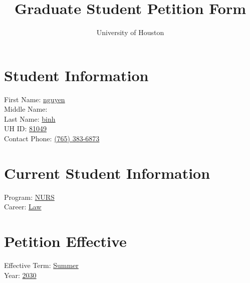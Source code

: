 \documentclass[a4paper,12pt]{article}
\title{Graduate Student Petition Form}
\author{University of Houston}
\date{}
\begin{document}
    
    \maketitle
    
    \section*{Student Information}
    \begin{tabbing}
    First Name: \hspace{3cm} \= \underline{\hspace{5cm} nguyen} \\
    Middle Name: \> \underline{\hspace{5cm} } \\
    Last Name: \> \underline{\hspace{5cm}  binh} \\
    UH ID: \> \underline{\hspace{5cm} 81049} \\
    Contact Phone: \> \underline{\hspace{5cm} (765) 383-6873} \\
    \end{tabbing}
    
    \section*{Current Student Information}
    \begin{tabbing}
    Program: \hspace{3cm} \= \underline{\hspace{5cm} NURS} \\
    Career: \> \underline{\hspace{5cm} Law} \\
    \end{tabbing}
    
    \section*{Petition Effective}
    \begin{tabbing}
    Effective Term: \hspace{2cm} \= \underline{\hspace{5cm} Summer} \\
    Year: \> \underline{\hspace{5cm} 2030} \\
    \end{tabbing}
    
\end{document}

